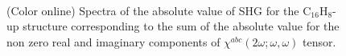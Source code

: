 \documentclass[pss]{wiley2sp} %
\begin{document}
\begin{figure}[t]
\\
\caption{(Color online) Spectra of the absolute value of SHG for the
    C$_{16}$H$_{8}$-up structure corresponding to the
    sum of the absolute value for the non zero real and imaginary components
    of $\chi^{abc}(2\omega;\omega,
    \omega) $ tensor.\label{fig:up-shg-abs}}
\end{figure}
\end{document}
